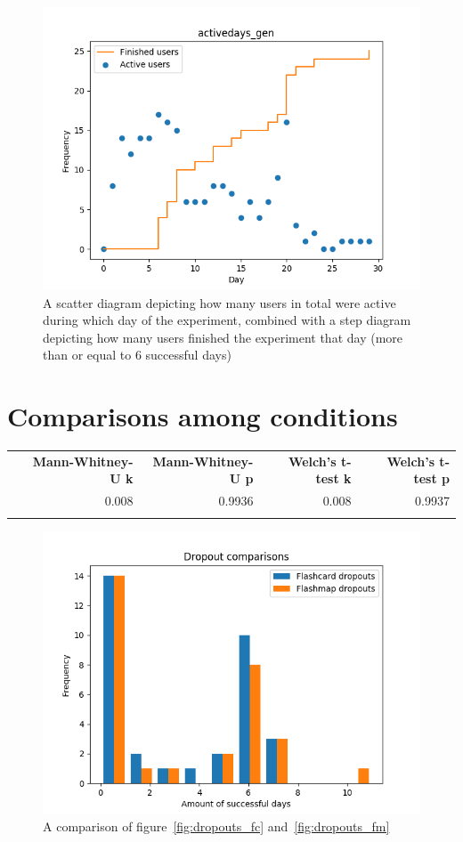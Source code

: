 \begin{figure}
    \centering
    \includegraphics[width=.7\textwidth]{img/activedays_gen.png}
    \caption{A scatter diagram depicting how many users in total were active during which day of the experiment, combined with a step diagram depicting how many users finished the experiment that day (more than or equal to 6 successful days)}
    \label{fig:activedays_gen}
\end{figure}

\FloatBarrier
\section{Comparisons among conditions}

\begin{longtable}[c]{@{}lrrrr@{}}
\toprule\addlinespace
& \textbf{Mann-Whitney-U k} & \textbf{Mann-Whitney-U p} &
\textbf{Welch's t-test k} & \textbf{Welch's t-test p}
\\\addlinespace
\midrule\endhead
& 0.008 & 0.9936 & 0.008 & 0.9937
\\\addlinespace
\bottomrule
    \label{tab:dropouts-comp}
\end{longtable}

\begin{figure}[htbp]
    \centering
    \includegraphics[width=.7\textwidth]{img/dropouts.png}
    \caption{A comparison of figure~\protect\ref{fig:dropouts_fc} and~\protect\ref{fig:dropouts_fm}}
    \label{fig:dropouts}
\end{figure}
